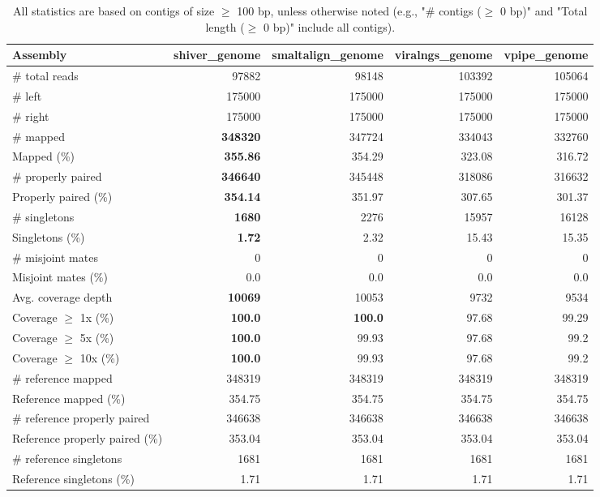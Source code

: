 \documentclass[12pt,a4paper]{article}
\begin{document}
\begin{table}[ht]
\begin{center}
\caption{All statistics are based on contigs of size $\geq$ 100 bp, unless otherwise noted (e.g., "\# contigs ($\geq$ 0 bp)" and "Total length ($\geq$ 0 bp)" include all contigs).}
\begin{tabular}{|l*{4}{|r}|}
\hline
Assembly & shiver\_genome & smaltalign\_genome & viralngs\_genome & vpipe\_genome \\ \hline
\# total reads & 97882 & 98148 & 103392 & 105064 \\ \hline
\# left & 175000 & 175000 & 175000 & 175000 \\ \hline
\# right & 175000 & 175000 & 175000 & 175000 \\ \hline
\# mapped & {\bf 348320} & 347724 & 334043 & 332760 \\ \hline
Mapped (\%) & {\bf 355.86} & 354.29 & 323.08 & 316.72 \\ \hline
\# properly paired & {\bf 346640} & 345448 & 318086 & 316632 \\ \hline
Properly paired (\%) & {\bf 354.14} & 351.97 & 307.65 & 301.37 \\ \hline
\# singletons & {\bf 1680} & 2276 & 15957 & 16128 \\ \hline
Singletons (\%) & {\bf 1.72} & 2.32 & 15.43 & 15.35 \\ \hline
\# misjoint mates & 0 & 0 & 0 & 0 \\ \hline
Misjoint mates (\%) & 0.0 & 0.0 & 0.0 & 0.0 \\ \hline
Avg. coverage depth & {\bf 10069} & 10053 & 9732 & 9534 \\ \hline
Coverage $\geq$ 1x (\%) & {\bf 100.0} & {\bf 100.0} & 97.68 & 99.29 \\ \hline
Coverage $\geq$ 5x (\%) & {\bf 100.0} & 99.93 & 97.68 & 99.2 \\ \hline
Coverage $\geq$ 10x (\%) & {\bf 100.0} & 99.93 & 97.68 & 99.2 \\ \hline
\# reference mapped & 348319 & 348319 & 348319 & 348319 \\ \hline
Reference mapped (\%) & 354.75 & 354.75 & 354.75 & 354.75 \\ \hline
\# reference properly paired & 346638 & 346638 & 346638 & 346638 \\ \hline
Reference properly paired (\%) & 353.04 & 353.04 & 353.04 & 353.04 \\ \hline
\# reference singletons & 1681 & 1681 & 1681 & 1681 \\ \hline
Reference singletons (\%) & 1.71 & 1.71 & 1.71 & 1.71 \\ \hline

\end{tabular}
\end{center}
\end{table}
\end{document}
